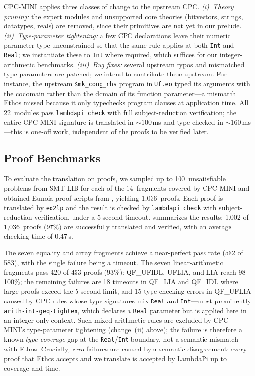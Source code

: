 \documentclass[class=llncs, crop=false]{standalone}
\begin{document}
CPC-MINI applies three classes of change to the
upstream CPC.
\emph{(i)~Theory pruning:} the expert modules and
unsupported core theories (bitvectors, strings,
datatypes, reals) are removed, since their primitives
are not yet in our prelude.
\emph{(ii)~Type-parameter tightening:} a few CPC
declarations leave their numeric parameter type
unconstrained so that the same rule applies at both
\texttt{Int} and \texttt{Real}; we instantiate these
to \texttt{Int} where required, which suffices for
our integer-arithmetic benchmarks.
\emph{(iii)~Bug fixes:} several upstream typos and
mismatched type parameters are patched; we intend to
contribute these upstream. For instance, the
upstream \texttt{\$mk\_cong\_rhs} program in
\texttt{Uf.eo} typed its arguments with the codomain
rather than the domain of its function
parameter---a mismatch Ethos missed because it only
typechecks program clauses at application time.
%
All 22~modules pass
\texttt{lambdapi check} with full subject-reduction
verification; the entire CPC-MINI signature is
translated in ${\sim}100$\,ms and type-checked in
${\sim}160$\,ms---this is one-off work, independent
of the proofs to be verified later.

\subsection{Proof Benchmarks}
%
To evaluate the translation on proofs,
we sampled up to 100~unsatisfiable problems from
SMT-LIB for each of the 14~fragments covered by
CPC-MINI and obtained Eunoia proof scripts from
, yielding 1{,}036~proofs.
%
Each proof is translated by \texttt{eo2lp} and
the result is checked by \texttt{lambdapi check}
with subject-reduction verification,
under a 5-second timeout.
%
 summarizes the results:
1{,}002 of 1{,}036~proofs (97\%) are
successfully translated and verified,
with an average checking time of 0.47\,s.



The seven equality and array fragments achieve a
near-perfect pass rate (582 of 583), with the single
failure being a timeout. The seven linear-arithmetic
fragments pass 420 of 453 proofs (93\%):
QF\_UFIDL, UFLIA, and LIA reach 98--100\%; the
remaining failures are 18 timeouts in QF\_LIA and
QF\_IDL where large proofs exceed the 5-second
limit, and 15 type-checking errors in QF\_UFLIA
caused by CPC rules whose type signatures mix
\texttt{Real} and \texttt{Int}---most prominently
\texttt{arith-int-geq-tighten}, which declares a
\texttt{Real} parameter but is applied here in an
integer-only context.
Such mixed-arithmetic rules are excluded by
CPC-MINI's type-parameter tightening (change~(ii)
above); the failure is therefore a known
\emph{type coverage} gap at the
\texttt{Real}/\texttt{Int} boundary, not a semantic
mismatch with Ethos. Crucially, \emph{zero} failures
are caused by a semantic disagreement: every proof
that Ethos accepts and we translate is accepted by
LambdaPi up to coverage and time.
\end{document}
